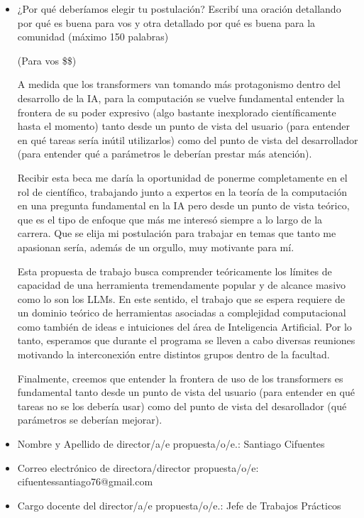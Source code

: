 \documentclass{article}
\begin{document}
\begin{itemize}
    \item ¿Por qué deberíamos elegir tu postulación? Escribí una oración detallando por qué es buena para vos y otra detallado por qué es buena para la comunidad (máximo 150 palabras)

    (Para vos \$\$)

    A medida que los transformers van tomando más protagonismo dentro del desarrollo de la IA, para la computación se vuelve fundamental entender la frontera de su poder expresivo (algo bastante inexplorado científicamente hasta el momento) tanto desde un punto de vista del usuario (para entender en qué tareas sería inútil utilizarlos) como del punto de vista del desarrollador (para entender qué a parámetros le deberían prestar más atención).

    Recibir esta beca me daría la oportunidad de ponerme completamente en el rol de científico, trabajando junto a expertos en la teoría de la computación en una pregunta fundamental en la IA pero desde un punto de vista teórico, que es el tipo de enfoque que más me interesó siempre a lo largo de la carrera. Que se elija mi postulación para trabajar en temas que tanto me apasionan sería, además de un orgullo, muy motivante para mí.

    

    Esta propuesta de trabajo busca comprender teóricamente los límites de capacidad de una herramienta tremendamente popular y de alcance masivo como lo son los LLMs. En este sentido, el trabajo que se espera requiere de un dominio teórico de herramientas asociadas a complejidad computacional como también de ideas e intuiciones del área de Inteligencia Artificial. Por lo tanto, esperamos que durante el programa se lleven a cabo diversas reuniones motivando la interconexión entre distintos grupos dentro de la facultad.

    Finalmente, creemos que entender la frontera de uso de los transformers es fundamental tanto desde un punto de vista del usuario (para entender en qué tareas no se los debería usar) como del punto de vista del desarollador (qué parámetros se deberían mejorar).

    \item Nombre y Apellido de director/a/e propuesta/o/e.: Santiago Cifuentes

    \item Correo electrónico de directora/director propuesta/o/e: cifuentessantiago76@gmail.com

    \item Cargo docente del director/a/e propuesta/o/e.: Jefe de Trabajos Prácticos


\end{itemize}
\end{document}

